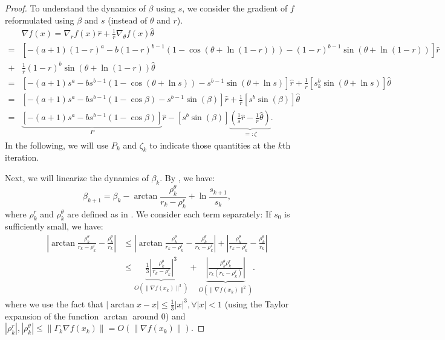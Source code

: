 \documentclass[10pt,a4paper]{amsart}
\begin{document}
\begin{proof}
    To understand the dynamics of $\beta$ using $s$, we consider the gradient of $f$ reformulated using $\beta$ and $s$ (instead of $\theta$ and $r$).
    \begin{equation*}
        \begin{aligned}
            &\nabla f(x) = \nabla_r f(x) \hat{r} + \frac{1}{r} \nabla_\theta f(x) \hat{\theta}\\
            =& [-(a+1)(1 - r)^{a} - b(1-r)^{b-1}(1 - \cos(\theta + \ln(1 - r))) - (1 - r)^{b - 1}\sin(\theta + \ln(1 - r))] \hat{r} \\
            +& \frac{1}{r}(1 - r)^b \sin(\theta + \ln(1-r)) \hat{\theta}\\
            =& \left[-(a+1)s^{a} - bs^{b-1}(1 - \cos(\theta + \ln s)) - s^{b - 1}\sin(\theta + \ln s)\right] \hat{r} + \frac{1}{r}\left[s_k^b \sin(\theta + \ln s)\right] \hat{\theta}\\
            =& \left[-(a+1)s^{a} - bs^{b-1}(1 - \cos\beta) - s^{b - 1}\sin(\beta)\right] \hat{r} + \frac{1}{r}\left[s^b \sin(\beta)\right] \hat{\theta}\\
            =&\underbrace{\left[-(a+1)s^{a} - bs^{b-1}(1 - \cos\beta)\right]}_{P} \hat{r} - \left[s^b \sin(\beta)\right]\underbrace{\left(\frac{1}{s}\hat{r} - \frac{1}{r}\hat{\theta}\right)}_{=:\zeta}.
        \end{aligned}
    \end{equation*}
    In the following, we will use $P_k$ and $\zeta_k$ to indicate those quantities at the $k$th iteration. 
    
    Next, we will linearize the dynamics of $\beta_k$. By , we have:
    \begin{equation*}
        \beta_{k + 1} = \beta_k - \arctan \frac{\rho_k^\theta}{r_k - \rho^r_k} + \ln \frac{s_{k+1}}{s_{k}},
    \end{equation*}
    where $\rho_k^r$ and $\rho_k^\theta$ are defined as in . We consider each term separately: If $s_0$ is sufficiently small, we have:
    \begin{equation*}
        \begin{aligned}
            \left|\arctan \frac{\rho_k^\theta}{r_k - \rho^r_k} - \frac{\rho_k^\theta}{r_k}\right| & \leq \left|\arctan \frac{\rho_k^\theta}{r_k - \rho^r_k} - \frac{\rho_k^\theta}{r_k - \rho^r_k}\right| + \left|\frac{\rho_k^\theta}{r_k - \rho^r_k} - \frac{\rho_k^\theta}{r_k}\right|\\
            &\leq \underbrace{\frac{1}{3}\left|\frac{\rho_k^\theta}{r_k - \rho^r_k}\right|^3}_{O(\|\nabla f(x_k)\|^3)} + \underbrace{\left|\frac{\rho_k^\theta\rho_k^r}{r_k(r_k - \rho^r_k)}\right|}_{O(\|\nabla f(x_k)\|^2)}.
        \end{aligned}
    \end{equation*}
    where we use the fact that $|\arctan x - x| \leq \frac{1}{3}|x|^3, \forall |x| < 1$ (using the Taylor expansion of the function $\arctan$ around $0$) and $|\rho_k^r|, |\rho_k^\theta| \leq \|\Gamma_k \nabla f(x_k)\| = O(\|\nabla f(x_k)\|)$.


\end{proof}
\end{document}
